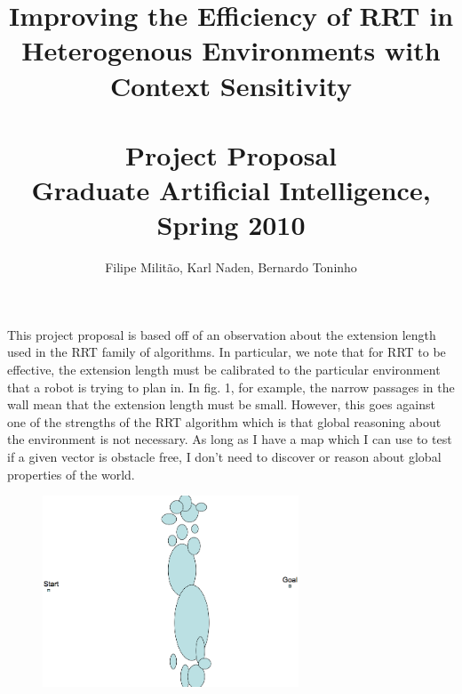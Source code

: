 \documentclass[10pt]{amsart}
\title{\large{Improving the Efficiency of RRT in Heterogenous Environments with Context Sensitivity}\\~\\\small{Project Proposal}\\\small{Graduate Artificial Intelligence, Spring 2010}}
\author{Filipe Milit\~{a}o, Karl Naden, Bernardo Toninho}
\begin{document}
\maketitle

This project proposal is based off of an observation about the extension length used in the RRT \cite{Bruce02real-timerandomized} family of algorithms.  In particular, we note that for RRT to be effective, the extension length must be calibrated to the particular environment that a robot is trying to plan in.  In fig. 1, for example, the narrow passages in the wall mean that the extension length must be small.  However, this goes against one of the strengths of the RRT algorithm which is that global reasoning about the environment is not necessary.  As long as I have a map which I can use to test if a given vector is obstacle free, I don't need to discover or reason about global properties of the world.

\begin{figure}
\begin{center}
\includegraphics[width=3in]{space.png}
\end{center}
\end{figure}
\end{document}
